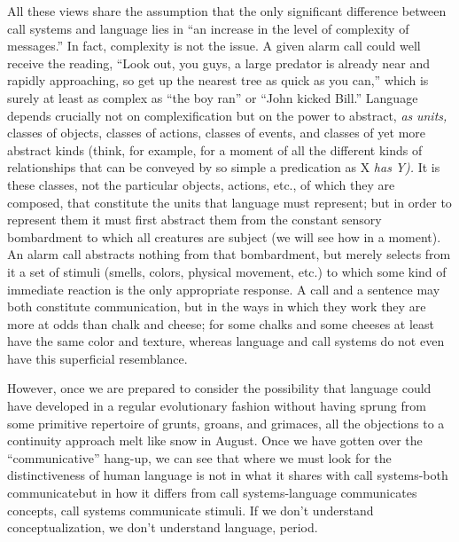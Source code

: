 All these views share the assumption that the only significant difference between call systems and language lies in ``an increase in the level of complexity of messages.'' In fact, complexity is not the issue. A given alarm call could well receive the reading, ``Look out, you guys, a large predator is already near and rapidly approaching, so get up the nearest tree as quick as you can,'' which is surely at least as complex as ``the boy ran'' or ``John kicked Bill.'' Language depends crucially not on complexification but on the power to abstract, \textit{as} \textit{units,} classes of objects, classes of actions, classes of events, and classes
of yet more abstract kinds (think, for example, for a moment of all the different kinds of relationships that can be conveyed by so simple a predication as X \textit{has} \textit{Y).} It is these classes, not the particular objects, actions, etc., of which they are composed, that constitute the units that language must represent; but in order to represent them it must first abstract them from the constant sensory bombardment to which all creatures are subject (we will see how in a moment). An alarm call
abstracts nothing from that bombardment, but merely selects from it a set of stimuli (smells, colors, physical movement, etc.) to which some kind of immediate reaction is the only appropriate response. A call and a sentence may both constitute communication, but in the ways in which they work they are more at odds than chalk and cheese; for some chalks and some cheeses at least have the same color and texture, whereas language and call systems do not even have this superficial resemblance.

However, once we are prepared to consider the possibility that language could have developed in a regular evolutionary fashion with\-out having sprung from some primitive repertoire of grunts, groans, and grimaces, all the objections to a continuity approach melt like snow in August. Once we have gotten over the ``communicative'' hang-up, we can see that where we must look for the distinctiveness of human language is not in what it shares with call systems-both communicate\-but in how it differs from call systems-language communicates con\-cepts, call systems communicate stimuli. If we don't understand con\-ceptualization, we don't understand language, period.

